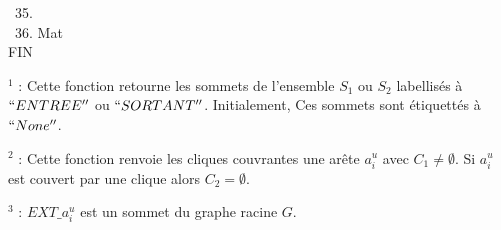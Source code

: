 \begin{algorithm}
~35.  \\
~36.  Mat\\
\noindent FIN\\
\end{algorithm}

$^1$ : Cette fonction retourne les sommets de l'ensemble $S_1$ ou $S_2$ labellis\'es \`a $``ENTREE''$ ou $``SORTANT''$. Initialement, Ces sommets sont \'etiquett\'es \`a $``None''$.

$^2$ : Cette fonction renvoie les cliques couvrantes une ar\^ete $a_i^u$ avec $C_1 \ne \emptyset$. Si $a_i^u$ est couvert par une clique alors $C_2 = \emptyset$.

$^3$ : $EXT\_a_i^u$ est un sommet du graphe racine $G$.
\newline

